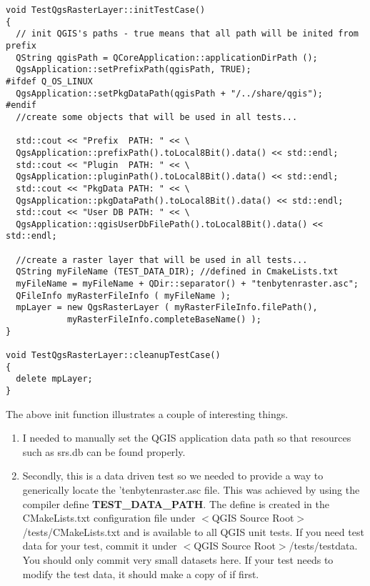 \begin{verbatim}
void TestQgsRasterLayer::initTestCase()
{
  // init QGIS's paths - true means that all path will be inited from prefix
  QString qgisPath = QCoreApplication::applicationDirPath ();
  QgsApplication::setPrefixPath(qgisPath, TRUE);
#ifdef Q_OS_LINUX
  QgsApplication::setPkgDataPath(qgisPath + "/../share/qgis");
#endif
  //create some objects that will be used in all tests...

  std::cout << "Prefix  PATH: " << \
  QgsApplication::prefixPath().toLocal8Bit().data() << std::endl;
  std::cout << "Plugin  PATH: " << \
  QgsApplication::pluginPath().toLocal8Bit().data() << std::endl;
  std::cout << "PkgData PATH: " << \
  QgsApplication::pkgDataPath().toLocal8Bit().data() << std::endl;
  std::cout << "User DB PATH: " << \
  QgsApplication::qgisUserDbFilePath().toLocal8Bit().data() << std::endl;

  //create a raster layer that will be used in all tests...
  QString myFileName (TEST_DATA_DIR); //defined in CmakeLists.txt
  myFileName = myFileName + QDir::separator() + "tenbytenraster.asc";
  QFileInfo myRasterFileInfo ( myFileName );
  mpLayer = new QgsRasterLayer ( myRasterFileInfo.filePath(),
            myRasterFileInfo.completeBaseName() );
}

void TestQgsRasterLayer::cleanupTestCase()
{
  delete mpLayer;
}

\end{verbatim}

The above init function illustrates a couple of interesting things.

\begin{enumerate}
\item I needed to manually set the QGIS application data path so that
   resources such as srs.db can be found properly.
\item Secondly, this is a data driven test so we needed to provide a 
   way to generically locate the 'tenbytenraster.asc file. This was 
   achieved by using the compiler define \textbf{TEST\_DATA\_PATH}. The 
   define is created in the CMakeLists.txt configuration file under 
   $<$QGIS Source Root$>$/tests/CMakeLists.txt and is available to all 
   QGIS unit tests. If you need test data for your test, commit it 
   under $<$QGIS Source Root$>$/tests/testdata. You should only commit 
   very small datasets here. If your test needs to modify the test 
   data, it should make a copy of if first.
\end{enumerate}

